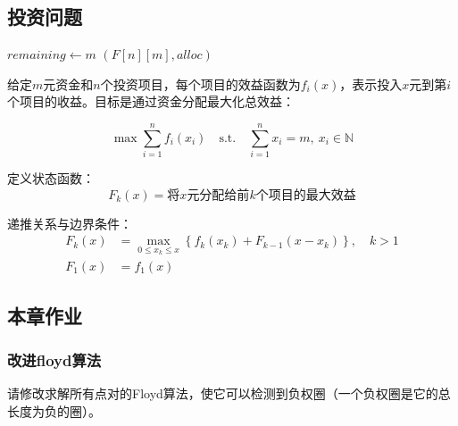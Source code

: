 \documentclass[./../main.tex]{subfiles}
\begin{document}
\subsection{投资问题}
\begin{algorithm}[t]
    \BlankLine
    \BlankLine
    \BlankLine
    $remaining \gets m$\;
    \BlankLine
    \Return $(F[n][m], alloc)$\;
    \caption{Investment-Allocation-DP}
\end{algorithm}

给定$m$元资金和$n$个投资项目，每个项目的效益函数为$f_i(x)$，表示投入$x$元到第$i$个项目的收益。目标是通过资金分配最大化总效益：

\begin{equation*}
    \max \sum_{i=1}^n f_i(x_i) \quad \text{s.t.} \quad \sum_{i=1}^n x_i = m,\ x_i \in \mathbb{N}
\end{equation*}

定义状态函数：
\begin{equation*}
    F_k(x) = \text{将$x$元分配给前$k$个项目的最大效益}
\end{equation*}

递推关系与边界条件：
\begin{align*}
    F_k(x) &= \max_{0 \leq x_k \leq x} \left\{ f_k(x_k) + F_{k-1}(x - x_k) \right\}, \quad k > 1 \\
    F_1(x) &= f_1(x)
\end{align*}

\subsection{本章作业}
\subsubsection{改进floyd算法}
请修改求解所有点对的Floyd算法，使它可以检测到负权圈（一个负权圈是它的总长度为负的圈）。
\end{document}
